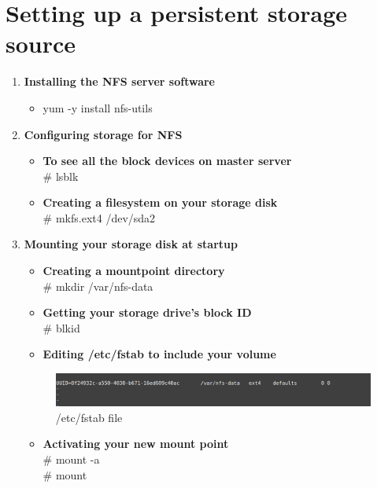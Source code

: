 \documentclass[11pt]{report}
\begin{document}
	\section{Setting up a persistent storage source}
	\begin{enumerate}
		\large
		\item \textbf{Installing the NFS server software}
		\begin{itemize}
			\item  yum -y install nfs-utils
		\end{itemize}
		\item \textbf{Configuring storage for NFS}
		\begin{itemize}
			\item  \textbf{To see all the block devices on master server}
			\ \\
			\# lsblk
			\item  \textbf{Creating a filesystem on your storage disk}
			\ \\
			\# mkfs.ext4 /dev/sda2
			
			
		\end{itemize}
		
		\item \textbf{Mounting your storage disk at startup}
		\begin{itemize}
			\item  \textbf{Creating a mountpoint directory}
			\ \\
			\# mkdir /var/nfs-data
			\item  \textbf{Getting your storage drive’s block ID}
			\ \\
			\# blkid
			\item  \textbf{Editing /etc/fstab to include your volume}
			\ \\
			\hfill
			
			
			
			
		\end{itemize}
			\begin{figure}[h!]
    	\begin{center}
    	   	\includegraphics[scale = 0.34]{fstab.png}
    		\caption{/etc/fstab file}
    	  \end{center}
	  
	\end{figure}
		\begin{itemize}
			\item \textbf{Activating your new mount point}
			\ \\
			\# mount -a
			\ \\
			\# mount
		\end{itemize} 
		

\end{enumerate}
\end{document}
